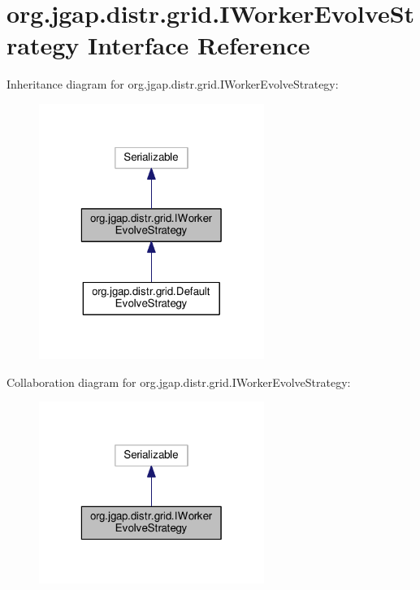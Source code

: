\hypertarget{interfaceorg_1_1jgap_1_1distr_1_1grid_1_1_i_worker_evolve_strategy}{\section{org.\-jgap.\-distr.\-grid.\-I\-Worker\-Evolve\-Strategy Interface Reference}
\label{interfaceorg_1_1jgap_1_1distr_1_1grid_1_1_i_worker_evolve_strategy}
}


Inheritance diagram for org.\-jgap.\-distr.\-grid.\-I\-Worker\-Evolve\-Strategy\-:
\nopagebreak
\begin{figure}[H]
\begin{center}
\leavevmode
\includegraphics[width=208pt]{interfaceorg_1_1jgap_1_1distr_1_1grid_1_1_i_worker_evolve_strategy__inherit__graph}
\end{center}
\end{figure}


Collaboration diagram for org.\-jgap.\-distr.\-grid.\-I\-Worker\-Evolve\-Strategy\-:
\nopagebreak
\begin{figure}[H]
\begin{center}
\leavevmode
\includegraphics[width=208pt]{interfaceorg_1_1jgap_1_1distr_1_1grid_1_1_i_worker_evolve_strategy__coll__graph}
\end{center}
\end{figure}

